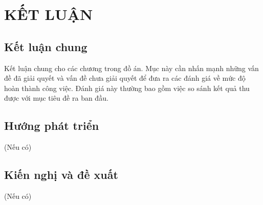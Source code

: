 \section*{KẾT LUẬN}
\subsection*{Kết luận chung}
Kết luận chung cho các chương trong đồ án. Mục này cần nhấn mạnh những vấn đề đã giải quyết và vấn đề chưa giải quyết để đưa ra các đánh giá về mức độ hoàn thành công việc. Đánh giá này thường bao gồm việc so sánh kết quả thu được với mục tiêu đề ra ban đầu.
\subsection*{Hướng phát triển}
(Nếu có)
\subsection*{Kiến nghị và đề xuất}
(Nếu có)
\newpage